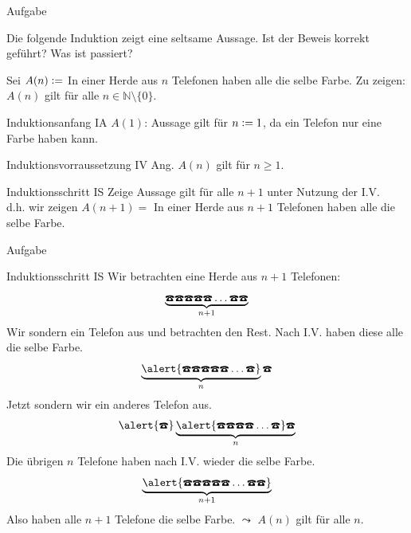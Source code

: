%
%
%
%

{
	\begin{frame}[fragile]{Aufgabe}
		\begin{alertblock}{Die folgende Induktion zeigt eine seltsame Aussage.}
			Ist der Beweis korrekt geführt? Was ist passiert?
		\end{alertblock}
		Sei $A(n)\vcentcolon=$ In einer Herde aus $n$ Telefonen haben alle die selbe Farbe.
		Zu zeigen: $A(n)$ gilt für alle $n \in \mathbb{N} \setminus \{0\} $.
		\begin{alertblock}{Induktionsanfang IA}
			$A(1)$: Aussage gilt für $n\vcentcolon= 1$, da ein Telefon nur eine Farbe haben kann.
		\end{alertblock}
		\begin{alertblock}{Induktionsvorraussetzung IV}
			Ang. $A(n)$ gilt für $n\geq1$.
		\end{alertblock}
		\begin{alertblock}{Induktionsschritt IS}
			Zeige Aussage gilt für alle $n+1$ unter Nutzung der I.V.\\
			d.h. wir zeigen $A(n+1)=$ In einer Herde aus $n+1$ Telefonen haben alle die selbe Farbe.
		\end{alertblock}
	\end{frame}
	\begin{frame}[fragile]{Aufgabe}
		\footnotesize{
			\begin{alertblock}{Induktionsschritt IS}
				Wir betrachten eine Herde aus $n+1$ Telefonen:
				\[\underbrace{\text{\Telefon}\text{\Telefon}\text{\Telefon}\text{\Telefon}\text{\Telefon}\dots\text{\Telefon}\text{\Telefon}}_{n+1}\]
				Wir sondern ein Telefon aus und betrachten den Rest. Nach I.V. haben diese alle die selbe Farbe.
				\[\underbrace{\alert{\text{\Telefon}\text{\Telefon}\text{\Telefon}\text{\Telefon}\text{\Telefon}\dots\text{\Telefon}}}_{n}\text{\Telefon}\]
				Jetzt sondern wir ein anderes Telefon aus.
				\[\alert{\text{\Telefon}}\underbrace{\alert{\text{\Telefon}\text{\Telefon}\text{\Telefon}\text{\Telefon}\dots\text{\Telefon}}\text{\Telefon}}_{n}\]
				Die übrigen $n$ Telefone haben nach I.V. wieder die selbe Farbe.
				\[\underbrace{\alert{\text{\Telefon}\text{\Telefon}\text{\Telefon}\text{\Telefon}\text{\Telefon}\dots\text{\Telefon}\text{\Telefon}}}_{n+1}\]
				Also haben alle $n+1$ Telefone die selbe Farbe.
				$\leadsto$ $A(n)$ gilt für alle $n$.
			\end{alertblock}
		}
	\end{frame}
}

